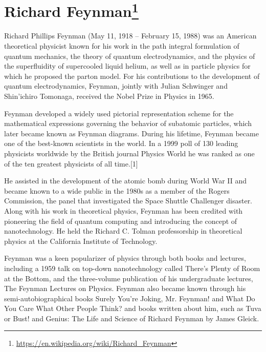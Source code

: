 \section*{Richard Feynman\protect\footnote{\url{https://en.wikipedia.org/wiki/Richard_Feynman}}}


Richard Phillips Feynman (May 11, 1918 – February 15, 1988) was an American theoretical physicist known for his work in the path integral formulation of quantum mechanics, the theory of quantum electrodynamics, and the physics of the superfluidity of supercooled liquid helium, as well as in particle physics for which he proposed the parton model. For his contributions to the development of quantum electrodynamics, Feynman, jointly with Julian Schwinger and Shin'ichiro Tomonaga, received the Nobel Prize in Physics in 1965.

Feynman developed a widely used pictorial representation scheme for the mathematical expressions governing the behavior of subatomic particles, which later became known as Feynman diagrams. During his lifetime, Feynman became one of the best-known scientists in the world. In a 1999 poll of 130 leading physicists worldwide by the British journal Physics World he was ranked as one of the ten greatest physicists of all time.[1]

He assisted in the development of the atomic bomb during World War II and became known to a wide public in the 1980s as a member of the Rogers Commission, the panel that investigated the Space Shuttle Challenger disaster. Along with his work in theoretical physics, Feynman has been credited with pioneering the field of quantum computing and introducing the concept of nanotechnology. He held the Richard C. Tolman professorship in theoretical physics at the California Institute of Technology.

Feynman was a keen popularizer of physics through both books and lectures, including a 1959 talk on top-down nanotechnology called There's Plenty of Room at the Bottom, and the three-volume publication of his undergraduate lectures, The Feynman Lectures on Physics. Feynman also became known through his semi-autobiographical books Surely You're Joking, Mr. Feynman! and What Do You Care What Other People Think? and books written about him, such as Tuva or Bust! and Genius: The Life and Science of Richard Feynman by James Gleick.
